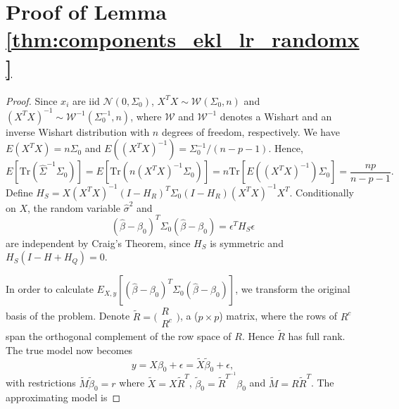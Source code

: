 \section{Proof of Lemma \ref{thm:components_ekl_lr_randomx}}
\begin{proof}
Since $x_i$ are iid $\mathcal{N}(0,\Sigma_0)$, $X^T X \sim \mathcal{W}(\Sigma_0, n)$ and $ (X^T X)^{-1} \sim \mathcal{W}^{-1} (\Sigma_0^{-1}, n)$, where $\mathcal{W}$ and $\mathcal{W}^{-1}$ denotes a Wishart and an inverse Wishart distribution with $n$ degrees of freedom, respectively. We have $E(X^T X) = n\Sigma_0$ and $E((X^T X)^{-1}) = \Sigma_0^{-1} / (n-p-1)$. Hence,
\begin{equation*}
  E \left[ \text{Tr}(\hat \Sigma^{-1}\Sigma_0) \right] = E \left[ \text{Tr} (n (X^T X)^{-1} \Sigma_0) \right] = n \text{Tr}\left[ E\left( (X^T X)^{-1} \right) \Sigma_0\right] = \frac{np}{n-p-1}.
\end{equation*}
Define $H_S = X(X^T X)^{-1}(I-H_R)^T \Sigma_0 (I-H_R) (X^T X)^{-1} X^T$. Conditionally on $X$, the random variable $\hat{\sigma}^2$ and 
\begin{equation*}
(\hat{\beta}-\beta_0)^T \Sigma_0 (\hat{\beta}-\beta_0) = \epsilon^T H_S \epsilon
\end{equation*}
are independent by Craig's Theorem, since $H_S$ is symmetric and $H_S(I-H+H_Q)=0$. 
\iffalse
We also have
\begin{equation*}
n\sigma_0^2 E_{X,y} \left[ \frac{1}{\hat\sigma^2} \right] = n\sigma_0^2 E_X\left[ E_y \left(\frac{1}{\hat\sigma^2}\big| X \right) \right] = n \frac{n}{n-p+m-2},
\end{equation*}
where the last equality we use the result in Lemma \ref{thm:components_ekl_lr_fixedx}. 
\fi
In order to calculate $\displaystyle E_{X,y}  \left [ (\hat \beta-\beta_0)^T \Sigma_0 (\hat \beta-\beta_0) \right ]$, we transform the original basis of the problem. Denote $\tilde{R} = \big(\begin{smallmatrix}
  R\\
  R^c
\end{smallmatrix}\big)$, a ($p \times p$) matrix, where the rows of $R^c$ span the orthogonal complement of the row space of $R$. Hence $\tilde{R}$ has full rank. The true model now becomes
\begin{equation*}
y = X \beta_0 + \epsilon = \tilde{X} \tilde{\beta}_0 + \epsilon,
\end{equation*}
with restrictions $\tilde{M} \tilde{\beta}_0 = r$ where $\tilde{X} = X \tilde{R}^T$, $\tilde{\beta}_0 = \tilde{R}^{T^{-1}} \beta_0$ and $\tilde{M} = R \tilde{R}^T$. The approximating model is

\end{proof}
